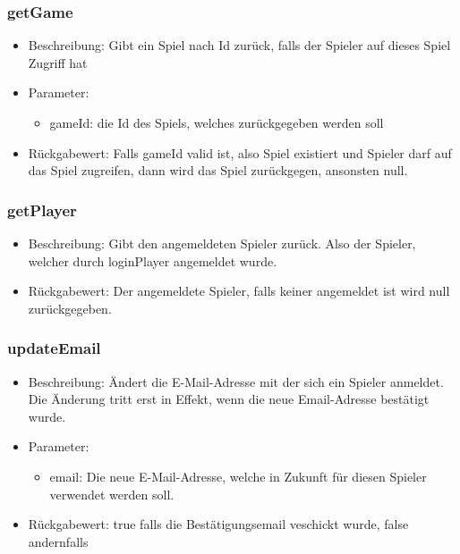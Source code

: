 \documentclass[a4paper]{scrreprt}
\begin{document}
    \subsubsection{getGame}
    \begin{itemize}
        \item Beschreibung: Gibt ein Spiel nach Id zurück, falls der Spieler auf dieses Spiel Zugriff hat
        \item Parameter:
        \begin{itemize}
            \item gameId: die Id des Spiels, welches zurückgegeben werden soll
        \end{itemize}
        \item Rückgabewert: Falls gameId valid ist, also Spiel existiert und Spieler darf auf das Spiel zugreifen, dann wird das Spiel zurückgegen, ansonsten null. 
    \end{itemize}
    \subsubsection{getPlayer}
    \begin{itemize}
        \item Beschreibung: Gibt den angemeldeten Spieler zurück. Also der Spieler, welcher durch loginPlayer angemeldet wurde.
        \item Rückgabewert: Der angemeldete Spieler, falls keiner angemeldet ist wird null zurückgegeben. 
    \end{itemize}
    \subsubsection{updateEmail}
    \begin{itemize}
        \item Beschreibung: Ändert die E-Mail-Adresse mit der sich ein Spieler anmeldet. Die Änderung tritt erst in Effekt, wenn die neue Email-Adresse bestätigt wurde.
        \item Parameter:
        \begin{itemize}
            \item email: Die neue E-Mail-Adresse, welche in Zukunft für diesen Spieler verwendet werden soll.
        \end{itemize}
        \item Rückgabewert: true falls die Bestätigungsemail veschickt wurde, false andernfalls 
    \end{itemize}
\end{document}
